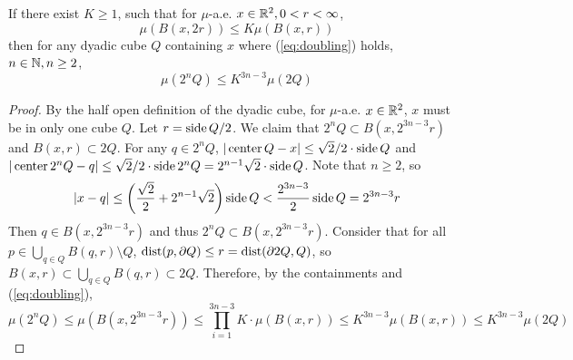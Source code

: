 \begin{lemma}
    If there exist $K\geq1$, such that for $\mu$-a.e. $x\in \mathbb{R}^2, 0<r<\infty$, 
    \begin{equation}
        \mu(B(x, 2r))\leq K\mu(B(x,r))
    \end{equation} 
    then for any dyadic cube $Q$ containing $x$ where (\ref{eq:doubling}) holds, $n\in \mathbb{N}, n\geq 2$,
    \begin{equation}
        \mu(2^n Q)\leq K^{3n-3} \mu(2Q)
    \end{equation}
\end{lemma}
\begin{proof}
    By the half open definition of the dyadic cube, for $\mu$-a.e. $x\in \mathbb{R}^2$, $x$ must be in only one cube $Q$. Let $r = \operatorname{side} Q /2$. We claim that $2^n Q\subset B(x, 2^{3n-3}r)$ and $B(x, r)\subset 2Q$. For any $q\in 2^n Q$, $|\operatorname{center} Q -x|\leq \sqrt{2}/2\cdot\operatorname{side} Q $ and $|\operatorname{center} 2^n Q -q|\leq \sqrt{2}/2 \cdot\operatorname{side} 2^n Q  = 2^{n-1}\sqrt{2}\cdot \operatorname{side} Q$. Note that $n\geq 2$, so
    \begin{equation*}
        |x-q| \leq \left(\frac{\sqrt{2}}{2} + 2^{n-1}\sqrt{2}\right) \operatorname{side} Q < \frac{2^{3n-3}}{2} \operatorname{side} Q = 2^{3n-3}r
    \end{equation*}
Then $q\in B(x, 2^{3n-3}r)$ and thus $2^n Q\subset B(x, 2^{3n-3}r)$. Consider that for all $p\in \bigcup_{q\in Q} B(q, r)\setminus Q$, $\operatorname{dist}(p, \partial Q)\leq r = \operatorname{dist}(\partial 2Q, Q)$, so $B(x, r)\subset \bigcup_{q\in Q} B(q, r)\subset 2Q$. Therefore, by the containments and (\ref{eq:doubling}), 
    \begin{equation*}
        \mu(2^n Q) \leq \mu(B(x, 2^{3n-3}r)) \leq \prod_{i=1}^{3n-3} K \cdot \mu(B(x,r))\leq K^{3n-3}\mu(B(x,r))\leq K^{3n-3}\mu(2Q)
    \end{equation*}
\end{proof}

